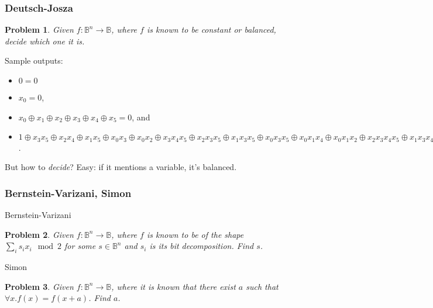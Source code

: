 \documentclass{beamer}
\newcommand{\Bool}{\ensuremath{\mathbb{B}}}
\newtheorem{prob}{Problem}
\begin{document}

\begin{frame}

\frametitle{Deutsch-Josza}

  \begin{prob}Given $f : \Bool^n\rightarrow\Bool$, where $f$ is known to be
\emph{constant} or \emph{balanced}, decide which one it is.
  \end{prob}

\pause

Sample outputs:
\begin{itemize}
\item $0 = 0$
\item $x_0 = 0$,
\item $x_0 \oplus x_1 \oplus x_2 \oplus x_3 \oplus
    x_4 \oplus x_5 = 0$, and
\item $1 \oplus x_3x_5 \oplus x_2x_4 \oplus x_1x_5
\oplus x_0x_3 \oplus x_0x_2 \oplus x_3x_4x_5 \oplus x_2x_3x_5 \oplus
x_1x_3x_5 \oplus x_0x_3x_5 \oplus x_0x_1x_4 \oplus x_0x_1x_2 \oplus
x_2x_3x_4x_5 \oplus x_1x_3x_4x_5 \oplus x_1x_2x_4x_5 \oplus
x_1x_2x_3x_5 \oplus x_0x_3x_4x_5 \oplus x_0x_2x_4x_5 \oplus
x_0x_2x_3x_5 \oplus x_0x_1x_4x_5 \oplus x_0x_1x_3x_5 \oplus
x_0x_1x_3x_4 \oplus x_0x_1x_2x_4 \oplus x_0x_1x_2x_4x_5 \oplus
x_0x_1x_2x_3x_5 \oplus x_0x_1x_2x_3x_4 = 0$.
\end{itemize}

  But how to \emph{decide}? Easy: if it mentions a variable, it's balanced.
\end{frame}


\begin{frame}

\frametitle{Bernstein-Varizani, Simon}

Bernstein-Varizani
\begin{prob}
    Given $f : \Bool^n\rightarrow\Bool$, where $f$ is known to be
of the shape $\sum_i s_i x_i \mod 2$ for some $s\in\Bool^n$ and $s_i$ is its
bit decomposition. Find $s$.
\end{prob}

\pause

Simon
\begin{prob}
    Given $f : \Bool^n\rightarrow\Bool$, where it is known that
    there exist $a$ such that $\forall x. f(x) = f(x + a)$. Find $a$.
\end{prob}

\end{frame}
\end{document}
